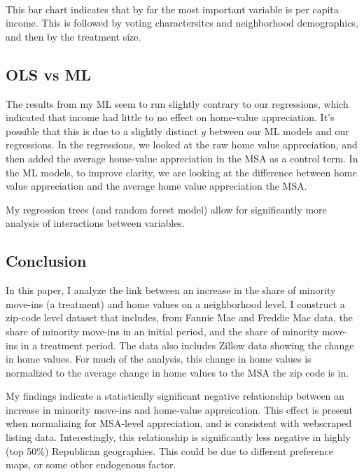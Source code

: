 \documentclass[11pt]{article}
\begin{document}
    \begin{center}
    \end{center}
    { \hspace*{\fill} \\}
    
    This bar chart indicates that by far the most important variable is per
capita income. This is followed by voting charactersitcs and
neighborhood demographics, and then by the treatment size.

    \subsection{OLS vs ML}\label{ols-vs-ml}

    The results from my ML seem to run slightly contrary to our regressions,
which indicated that income had little to no effect on home-value
appreciation. It's possible that this is due to a slightly distinct
\(y\) between our ML models and our regressions. In the regressions, we
looked at the raw home value appreciation, and then added the average
home-value appreciation in the MSA as a control term. In the ML models,
to improve clarity, we are looking at the difference between home value
appreciation and the average home value appreciation the MSA.

My regression trees (and random forest model) allow for significantly
more analysis of interactions between variables.

    \subsection{Conclusion}\label{conclusion}
    In this paper, I analyze the link between an increase in the share of minority move-ins (a treatment) and home values on a neighborhood level. I construct a zip-code level dataset that includes, from Fannie Mae and Freddie Mac data, the share of minority move-ins in an initial period, and the share of minority move-ins in a treatment period. The data also includes Zillow data showing the change in home values. For much of the analysis, this change in home values is normalized to the average change in home values to the MSA the zip code is in. 

    My findings indicate a statistically significant negative relationship between an increase in minority move-ins and home-value appreication. This effect is present when normalizing for MSA-level appreciation, and is consistent with webscraped listing data. Interestingly, this relationship is significantly less negative in highly (top 50\%) Republican geographies. This could be due to different preference maps, or some other endogenous factor.
    
\end{document}
